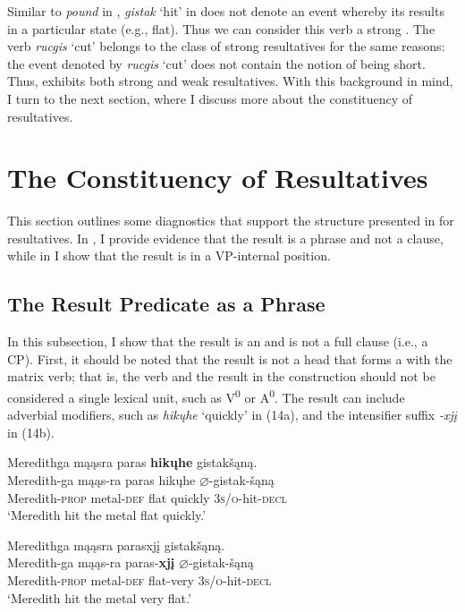 \documentclass[output=paper]{LSP/langsci}
\begin{document}
Similar to \textit{pound} in , \textit{gistak} `hit' in  does not denote an event whereby its  results in a particular state (e.g., flat). Thus we can consider this verb a strong . The verb \textit{rucgis} `cut' belongs to the class of strong resultatives for the same reasons: the event denoted by \textit{rucgis} `cut' does not contain the notion of being short. Thus,  exhibits both strong and weak resultatives. With this background in mind, I turn to the next section, where I discuss more about the constituency of  resultatives.

\section{The Constituency of  Resultatives}\label{sec:rosen:3}

This section outlines some diagnostics that support the structure presented in  for  resultatives. In , I provide evidence that the result is a phrase and not a clause, while in  I show that the result is in a VP-internal position.

\subsection{The Result Predicate as a Phrase}\label{sec:rosen:3.1}

In this subsection, I show that the result is an  and is not a full clause (i.e., a CP). First, it should be noted that the result is not a head that forms a  with the matrix verb; that is, the verb and the result in the construction should not be considered a single lexical unit, such as V\textsuperscript{0} or A\textsuperscript{0}. The result can include adverbial modifiers, such as \textit{hikųhe} `quickly' in (14a), and the intensifier suffix \textit{-xjį} in (14b).

\begin{exe}
\ex\label{ex:rosen:14}
\begin{xlist}

\ex \glll Meredithga mąąsra paras \textbf{hikųhe} gistakšąną. \\
 Meredith-ga mąąs-ra paras hikųhe {$\varnothing$}-gistak-šąną\\
Meredith-\textsc{prop} metal-\textsc{def} flat quickly \textsc{3s/o}-hit-\textsc{decl}\\ 
\glt `Meredith hit the metal flat quickly.'


\ex \glll Meredithga mąąsra parasxjį gistakšąną.\\
 Meredith-ga mąąs-ra paras-\textbf{xjį} {$\varnothing$}-gistak-šąną\\
Meredith-\textsc{prop} metal-\textsc{def} flat-very  \textsc{3s/o}-hit-\textsc{decl}\\
\glt `Meredith hit the metal very flat.'

\end{xlist}
\end{exe}
\end{document}
